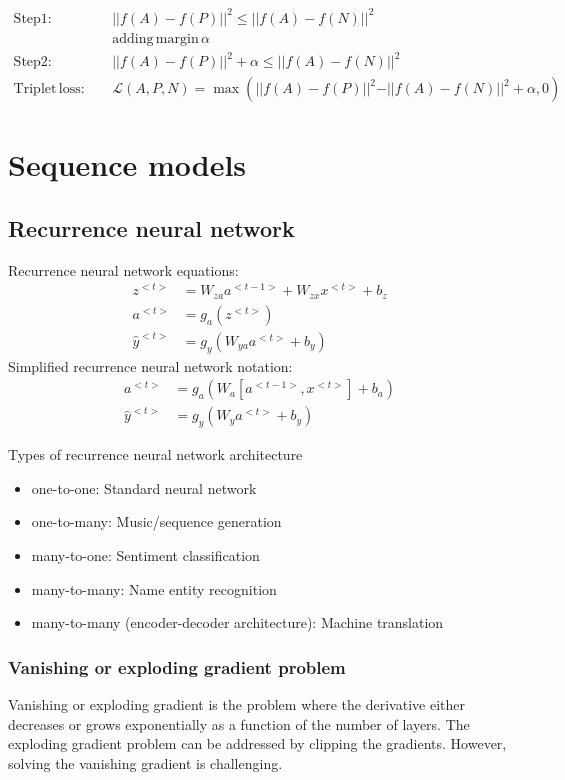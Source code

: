 \documentclass{book}
\begin{document}
\begin{align*}
\mathrm{Step 1:} \quad & \vert \vert f(A) - f(P) \vert \vert^2 \leq \vert \vert f(A) - f(N) \vert \vert^2 \\
& \mathrm{adding \, margin} \, \alpha \\
\mathrm{Step 2:} \quad & \vert \vert f(A) - f(P) \vert \vert^2 + \alpha \leq \vert \vert f(A) - f(N) \vert \vert^2 \\
\mathrm{Triplet \, loss:} \quad & \mathcal{L}(A,P,N) = \max(\vert \vert f(A) - f(P) \vert \vert^2 - \vert \vert f(A) - f(N) \vert \vert^2 + \alpha, 0)
\end{align*}

\chapter{Sequence models}
\section{Recurrence neural network}
Recurrence neural network equations:
\begin{align*}
z^{<t>} &= W_{za}a^{<t-1>} + W_{zx}x^{<t>} + b_{z} \\
a^{<t>} &= g_a(z^{<t>}) \\
\hat{y}^{<t>} &= g_y(W_{ya}a^{<t>} +b_{y})
\end{align*}
Simplified recurrence neural network notation:
\begin{align*}
a^{<t>} &= g_a(W_{a}[a^{<t-1>},x^{<t>}] + b_{a}) \\
\hat{y}^{<t>} &= g_y(W_{y}a^{<t>} +b_{y})
\end{align*}

Types of recurrence neural network architecture
\begin{itemize}\addtolength{\itemsep}{-0.5\baselineskip}
\item one-to-one: Standard neural network
\item one-to-many: Music/sequence generation
\item many-to-one: Sentiment classification
\item many-to-many: Name entity recognition
\item many-to-many (encoder-decoder architecture): Machine translation
\end{itemize}

\subsection{Vanishing or exploding gradient problem}
Vanishing or exploding gradient is the problem where the derivative either decreases or grows exponentially as a function of the number of layers. The exploding gradient problem can be addressed by clipping the gradients. However, solving the vanishing gradient is challenging.
\end{document}
